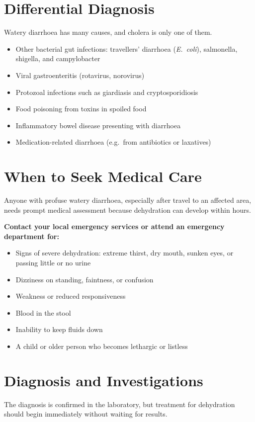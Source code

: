\section*{Differential Diagnosis}
Watery diarrhoea has many causes, and cholera is only one of them.

\begin{itemize}
    \item Other bacterial gut infections: travellers' diarrhoea (\textit{E.\ coli}), salmonella, shigella, and campylobacter
    \item Viral gastroenteritis (rotavirus, norovirus)
    \item Protozoal infections such as giardiasis and cryptosporidiosis
    \item Food poisoning from toxins in spoiled food
    \item Inflammatory bowel disease presenting with diarrhoea
    \item Medication-related diarrhoea (e.g.\ from antibiotics or laxatives)
\end{itemize}

\section*{When to Seek Medical Care}
Anyone with profuse watery diarrhoea, especially after travel to an affected area, needs prompt medical assessment because dehydration can develop within hours.

\textbf{Contact your local emergency services or attend an emergency department for:}
\begin{itemize}
    \item Signs of severe dehydration: extreme thirst, dry mouth, sunken eyes, or passing little or no urine
    \item Dizziness on standing, faintness, or confusion
    \item Weakness or reduced responsiveness
    \item Blood in the stool
    \item Inability to keep fluids down
    \item A child or older person who becomes lethargic or listless
\end{itemize}

\section*{Diagnosis and Investigations}
The diagnosis is confirmed in the laboratory, but treatment for dehydration should begin immediately without waiting for results.

